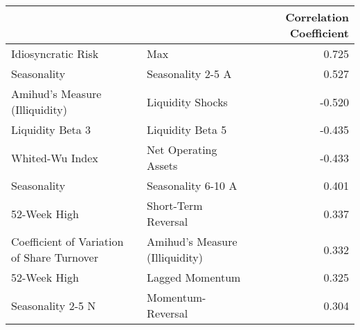 \begin{tabular}{llr}
\toprule
                  &                   &  Correlation Coefficient \\
\midrule
Idiosyncratic Risk & Max &                    0.725 \\
Seasonality & Seasonality 2-5 A &                    0.527 \\
Amihud's Measure (Illiquidity) & Liquidity Shocks &                   -0.520 \\
Liquidity Beta 3 & Liquidity Beta 5 &                   -0.435 \\
Whited-Wu Index & Net Operating Assets &                   -0.433 \\
Seasonality & Seasonality 6-10 A &                    0.401 \\
52-Week High & Short-Term Reversal &                    0.337 \\
Coefficient of Variation of Share Turnover & Amihud's Measure (Illiquidity) &                    0.332 \\
52-Week High & Lagged Momentum &                    0.325 \\
Seasonality 2-5 N & Momentum-Reversal &                    0.304 \\
\bottomrule
\end{tabular}
